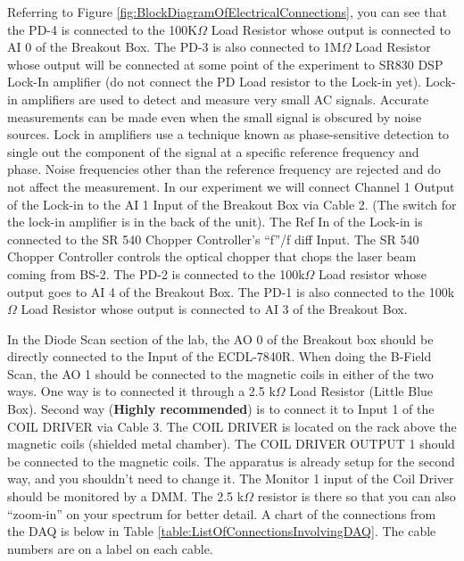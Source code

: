\documentclass{../lab}
\begin{document}
Referring to Figure \ref{fig:BlockDiagramOfElectricalConnections}, you can see that the PD-4 is connected to the 100K$\Omega$ Load Resistor whose output is connected to AI 0 of the Breakout Box. The PD-3 is also connected to 1M$\Omega$ Load Resistor whose output will be connected at some point of the experiment to SR830 DSP Lock-In amplifier (do not connect the PD Load resistor to the Lock-in yet). Lock-in amplifiers are used to detect and measure very small AC signals. Accurate measurements can be made even when the small signal is obscured by noise sources. Lock in amplifiers use a technique known as phase-sensitive detection to single out the component of the signal at a specific reference frequency and phase. Noise frequencies other than the reference frequency are rejected and do not affect the measurement. In our experiment we will connect Channel 1 Output of the Lock-in to the AI 1 Input of the Breakout Box via Cable 2. (The switch for the lock-in amplifier is in the back of the unit). The Ref In of the Lock-in is connected to the SR 540 Chopper Controller's ``f''/f diff Input. The SR 540 Chopper Controller controls the optical chopper that chops the laser beam coming from BS-2. The PD-2 is connected to the 100k$\Omega$ Load resistor whose output goes to AI 4 of the Breakout Box. The PD-1 is also connected to the 100k$\Omega$ Load Resistor whose output is connected to AI 3 of the Breakout Box.

\newpage

In the Diode Scan section of the lab, the AO 0 of the Breakout box should be directly connected to the Input of the ECDL-7840R. When doing the B-Field Scan, the AO 1 should be connected to the magnetic coils in either of the two ways. One way is to connected it through a 2.5 k$\Omega$ Load Resistor (Little Blue Box). Second way (\textbf{Highly recommended}) is to connect it to Input 1 of the COIL DRIVER via Cable 3. The COIL DRIVER is located on the rack above the magnetic coils (shielded metal chamber). The COIL DRIVER OUTPUT 1 should be connected to the magnetic coils. The apparatus is already setup for the second way, and you shouldn't need to change it. The Monitor 1 input of the Coil Driver should be monitored by a DMM. The 2.5 k$\Omega$ resistor is there so that you can also ``zoom-in'' on your spectrum for better detail. A chart of the connections from the DAQ is below in Table \ref{table:ListOfConnectionsInvolvingDAQ}. The cable numbers are on a label on each cable.
\end{document}
